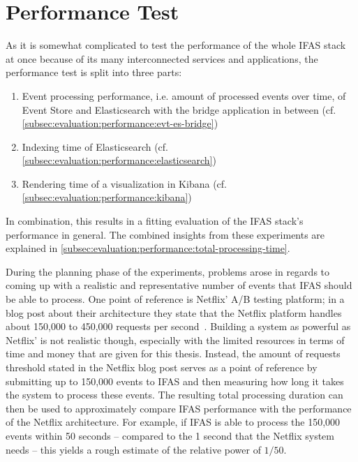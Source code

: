 \section{Performance Test}
\label{sec:evaluation:performance}

As it is somewhat complicated to test the performance of the whole \ac{IFAS} stack at once because of its many interconnected services and applications, the performance test is split into three parts:

\begin{enumerate}[noitemsep]
\item Event processing performance, i.e. amount of processed events over time, of Event Store and Elasticsearch with the bridge application in between (cf. \cref{subsec:evaluation:performance:evt-es-bridge})
\item Indexing time of Elasticsearch (cf. \cref{subsec:evaluation:performance:elasticsearch})
\item Rendering time of a visualization in Kibana (cf. \cref{subsec:evaluation:performance:kibana})
\end{enumerate}

In combination, this results in a fitting evaluation of the \ac{IFAS} stack's performance in general.
The combined insights from these experiments are explained in \cref{subsec:evaluation:performance:total-processing-time}.

During the planning phase of the experiments, problems arose in regards to coming up with a realistic and representative number of events that \ac{IFAS} should be able to process.
One point of reference is Netflix' A/B testing platform; in a blog post about their architecture they state that the Netflix platform handles about 150,000 to 450,000 requests per second~\cite{WEB:Netflix:2016}.
Building a system as powerful as Netflix' is not realistic though, especially with the limited resources in terms of time and money that are given for this thesis.
Instead, the amount of requests threshold stated in the Netflix blog post serves as a point of reference by submitting up to 150,000 events to \ac{IFAS} and then measuring how long it takes the system to process these events.
The resulting total processing duration can then be used to approximately compare \ac{IFAS} performance with the performance of the Netflix architecture.
For example, if \ac{IFAS} is able to process the 150,000 events within 50 seconds -- compared to the 1 second that the Netflix system needs -- this yields a rough estimate of the relative power of $1/50$.

